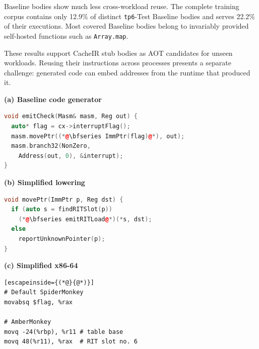 \documentclass[sigplan,screen,review,anonymous]{acmart}
\newcommand{\interBLstaticFinal}{12.9\%}
\newcommand{\interBLdynFinal}{22.2\%}
\begin{document}
Baseline bodies show much less cross-workload reuse. The complete training corpus contains only \interBLstaticFinal{} of distinct {\tt tp6}-Test Baseline bodies and serves \interBLdynFinal{} of their executions. Most covered Baseline bodies belong to invariably provided self-hosted functions such as \texttt{Array.map}.

These results support CacheIR stub bodies as AOT candidates for unseen workloads. Reusing their instructions across processes presents a separate challenge: generated code can embed addresses from the runtime that produced it.

\begin{listing*}[t!]
  \centering
  \begin{minipage}[t]{0.32\textwidth}
    \vspace{0pt}
    \centering
    {\footnotesize\bfseries (a) Baseline code generator\par}
    \smallskip
\begin{lstlisting}[language=C++]
void emitCheck(Masm& masm, Reg out) {
  auto* flag = cx->interruptFlag();
  masm.movePtr((*@\bfseries ImmPtr(flag)@*), out);
  masm.branch32(NonZero,
    Address(out, 0), &interrupt);
}
\end{lstlisting}
  \end{minipage}\hfill
  \begin{minipage}[t]{0.32\textwidth}
    \vspace{0pt}
    \centering
    {\footnotesize\bfseries (b) Simplified lowering\par}
    \smallskip
\begin{lstlisting}[language=C++,deletekeywords={auto}]
void movePtr(ImmPtr p, Reg dst) {
  if (auto s = findRITSlot(p))
    (*@\bfseries emitRITLoad@*)(*s, dst);
  else
    reportUnknownPointer(p);
}
\end{lstlisting}
  \end{minipage}\hfill
  \begin{minipage}[t]{0.32\textwidth}
    \vspace{0pt}
    \centering
    {\footnotesize\bfseries (c) Simplified x86-64\par}
    \smallskip
\begin{lstlisting}[escapeinside={(*@}{@*)}]
# Default SpiderMonkey
movabsq $flag, %rax

# AmberMonkey
movq -24(%rbp), %r11 # table base
movq 48(%r11), %rax  # RIT slot no. 6
\end{lstlisting}
  \end{minipage}
  \caption{Avoiding JIT coupling through Runtime Indirection
    Table (RIT) access. The unchanged generator (a) supplies the address,
    which lowers to a table access (b). Panel (c) compares the emitted
    instructions. Identifiers and offsets are simplified.}
  \label{lst:code-lowering}
\end{listing*}
\end{document}

